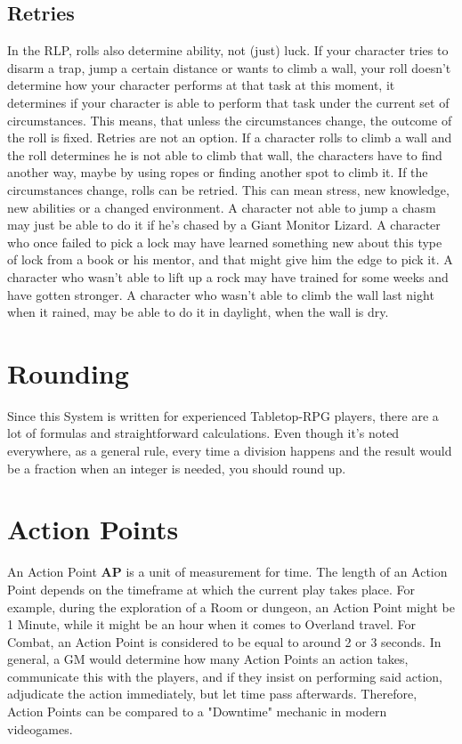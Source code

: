 \subsection{Retries}
In the RLP, rolls also determine ability, not (just) luck. If your character tries to disarm a trap, jump a certain distance or wants to climb a wall, your roll doesn’t determine how your character performs at that task at this moment, it determines if your character is able to perform that task under the current set of circumstances. This means, that unless the circumstances change, the outcome of the roll is fixed. Retries are not an option. If a character rolls to climb a wall and the roll determines he is not able to climb that wall, the characters have to find another way, maybe by using ropes or finding another spot to climb it.
If the circumstances change, rolls can be retried. This can mean stress, new knowledge, new abilities or a changed environment.
A character not able to jump a chasm may just be able to do it if he’s chased by a Giant Monitor Lizard.
A character who once failed to pick a lock may have learned something new about this type of lock from a book or his mentor, and that might give him the edge to pick it.
A character who wasn’t able to lift up a rock may have trained for some weeks and have gotten stronger.
A character who wasn’t able to climb the wall last night when it rained, may be able to do it in daylight, when the wall is dry.

\section{Rounding}
Since this System is written for experienced Tabletop-RPG players, there are a lot of formulas and straightforward calculations. Even though it’s noted everywhere, as a general rule, every time a division happens and the result would be a fraction when an integer is needed, you should round up.

\section{Action Points}
An Action Point \textbf{AP} is a unit of measurement for time. The length of an Action Point depends on the timeframe at which the current play takes place. For example, during the exploration of a Room or dungeon, an Action Point might be 1 Minute, while it might be an hour when it comes to Overland travel. For Combat, an Action Point is considered to be equal to around 2 or 3 seconds.
In general, a GM would determine how many Action Points an action takes, communicate this with the players, and if they insist on performing said action, adjudicate the action immediately, but let time pass afterwards.
Therefore, Action Points can be compared to a "Downtime" mechanic in modern videogames.

